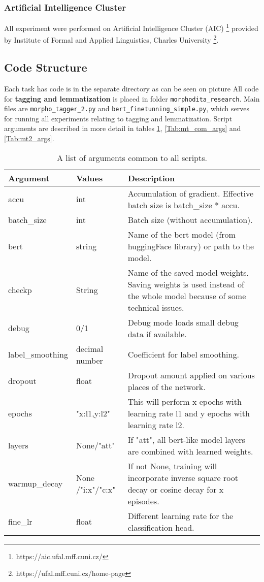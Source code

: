 \subsubsection{Artificial Intelligence Cluster}
All experiment were performed on Artificial Intelligence Cluster (AIC) \footnote{https://aic.ufal.mff.cuni.cz/} provided by Institute of Formal and Applied Linguistics, Charles University \footnote{https://ufal.mff.cuni.cz/home-page}.

\subsection{Code Structure}
Each task has code is in the separate directory as can be seen on picture %
All code for \textbf{tagging and lemmatization} is placed in folder \texttt{morphodita\_research}. Main files are \texttt{morpho\_tagger\_2.py} and \texttt{bert\_finetunning\_simple.py}, which serves for running all experiments relating to tagging and lemmatization. Script arguments are described in more detail in tables \ref{Tab:com_args}, \ref{Tab:mt_com_args} and \ref{Tab:mt2_args}.

\begin{table}
\centering
\label{Tab:com_args}
\begin{tabular}{ |p{3cm}|p{}|p{6cm}| } 
 \hline
 Argument & Values & Description \\ 
 \hline \hline
 accu & int & Accumulation of gradient. Effective batch size is batch\_size * accu.  \\\hline
batch\_size & int & Batch size (without accumulation). \\ \hline
bert & string & Name of the bert model (from huggingFace library) or path to the model.  \\ \hline
  checkp & String & Name of the saved model weights. Saving weights is used instead of the whole model because of some technical issues.  \\ \hline
  debug & 0/1 & Debug mode loads small debug data if available. \\ \hline
  label\_smoothing & decimal number & Coefficient for label smoothing. \\ \hline
  dropout & float &  Dropout amount applied on various places of the network.  \\ \hline
 epochs & "x:l1,y:l2"  & This will perform x epochs with learning rate l1 and y epochs with learning rate l2.   \\ \hline
 layers & None/"att" & If "att", all bert-like model layers are combined with learned weights.  \\ \hline
 warmup\_decay & None /"i:x"/"c:x" & If not None, training will incorporate inverse square root decay or cosine decay for x episodes.  \\ \hline
 fine\_lr & float & Different learning rate for the classification head.  \\ \hline
 \hline
\end{tabular}
\caption{A list of arguments common to all scripts.} 
\end{table}


